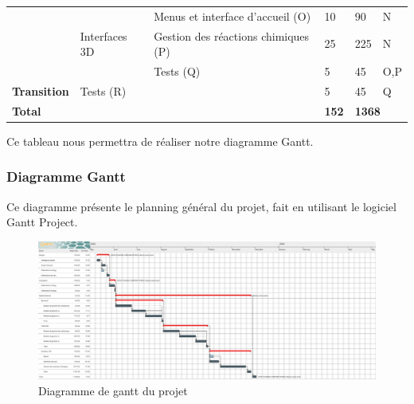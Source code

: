 \begin{table}[H]
{\begin{tabular}{|lll|l|ll|}
			\multicolumn{1}{|l|}{}                                          & \multicolumn{1}{l|}{\multirow{3}{*}{Interfaces 3D}}                     & Menus et interface d’accueil (O)                     & 10                                           & \multicolumn{1}{l|}{90}  & N   \\ \cline{3-6}
			\multicolumn{1}{|l|}{}                                          & \multicolumn{1}{l|}{}                                                   & Gestion des réactions chimiques (P)                  & 25                                           & \multicolumn{1}{l|}{225} & N   \\ \cline{3-6}
			\multicolumn{1}{|l|}{}                                          & \multicolumn{1}{l|}{}                                                   & Tests (Q)                                            & 5                                            & \multicolumn{1}{l|}{45}  & O,P \\ \hline
			\multicolumn{1}{|l|}{\textbf{Transition}}                       & \multicolumn{2}{l|}{Tests (R)}                                          & 5                                                    & \multicolumn{1}{l|}{45}                      & Q                              \\ \hline
			\multicolumn{3}{|l|}{\textbf{Total}}                            & \textbf{152}                                                            & \multicolumn{2}{l|}{\textbf{1368}}                                                                                                   \\ \hline
		\end{tabular}%
	}
\end{table}

Ce tableau nous permettra de réaliser notre diagramme Gantt.

\subsubsection{Diagramme Gantt}

Ce diagramme présente le planning général du projet, fait en utilisant le logiciel Gantt Project.

\begin{figure}[H]
	\centering
	\includegraphics[width=1.3\textwidth, angle=-90]{img/gantt}
	\caption{Diagramme de gantt du projet}
	\label{fig:mesh1}
\end{figure}

